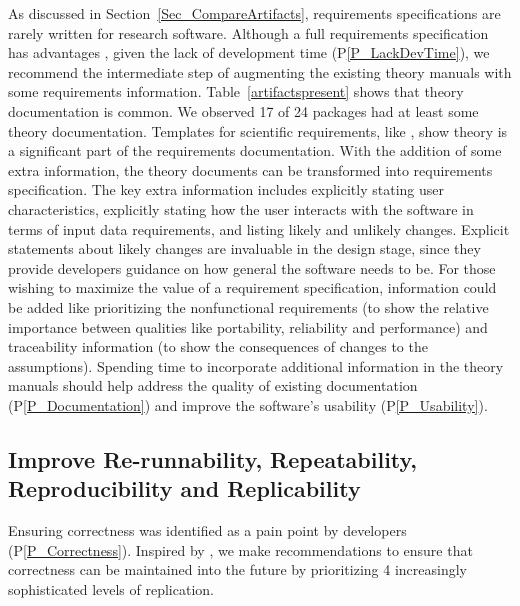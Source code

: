 \documentclass[final, 3p, times, authoryear]{elsarticle}
\newcommand{\ppref}[1]{P\ref{#1}}
\begin{document}
As discussed in Section~\ref{Sec_CompareArtifacts}, requirements specifications
are rarely written for research software. Although a full requirements
specification has advantages \citep{SmithEtAl2007, SmithAndLai2005},
given the lack of development time (\ppref{P_LackDevTime}), we recommend the
intermediate step of augmenting the existing theory manuals with some
requirements information.  Table~\ref{artifactspresent} shows that theory
documentation is common.  We observed 17 of 24 packages had at least some theory
documentation. Templates for scientific requirements, like \citet{SmithEtAl2007,
SmithAndLai2005}, show theory is a significant part of the requirements
documentation. With the addition of some extra information, the theory documents
can be transformed into requirements specification.  The key extra information
includes explicitly stating user characteristics, explicitly stating how the
user interacts with the software in terms of input data requirements, and
listing likely and unlikely changes.  Explicit statements about likely changes
are invaluable in the design stage, since they provide developers guidance on
how general the software needs to be.  For those wishing to maximize the value
of a requirement specification, information could be added like prioritizing the
nonfunctional requirements (to show the relative importance between qualities
like portability, reliability and performance) and traceability information (to
show the consequences of changes to the assumptions). Spending time to
incorporate additional information in the theory manuals should help address the
quality of existing documentation (\ppref{P_Documentation})  and improve the
software's usability (\ppref{P_Usability}).

\subsection{Improve Re-runnability, Repeatability, Reproducibility and Replicability}

Ensuring correctness was identified as a pain point by developers
(\ppref{P_Correctness}).  Inspired by \citet{BenureauAndRougier2017}, we make
recommendations to ensure that correctness can be maintained into the future by
prioritizing 4 increasingly sophisticated levels of replication.
\end{document}
